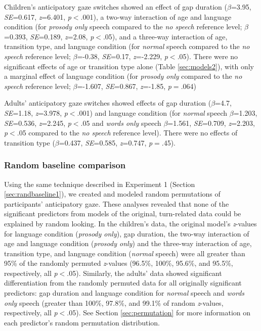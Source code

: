 \documentclass[authoryear, 12pt]{elsarticle}
\begin{document}
Children's anticipatory gaze switches showed an effect of gap duration (\textit{$\beta$}=3.95, \textit{SE}=0.617, \textit{z}=6.401, \textit{p}$<$.001), a two-way interaction of age and language condition (for \textit{prosody only} speech compared to the \textit{no speech} reference level; \textit{$\beta$}=0.393, \textit{SE}=0.189, \textit{z}=2.08, \textit{p}$<$.05), and a three-way interaction of age, transition type, and language condition (for \textit{normal} speech compared to the \textit{no speech} reference level; \textit{$\beta$}=-0.38, \textit{SE}=0.17, \textit{z}=-2.229, \textit{p}$<$.05). There were no significant effects of age or transition type alone (Table \ref{sec:models2}), with only a marginal effect of language condition (for \textit{prosody only} compared to the \textit{no speech} reference level; \textit{$\beta$}=-1.607, \textit{SE}=0.867, \textit{z}=-1.85, \textit{p}$=$.064)

Adults' anticipatory gaze switches showed effects of gap duration (\textit{$\beta$}=4.7, \textit{SE}=1.18, \textit{z}=3.978, \textit{p}$<$.001) and language condition (for \textit{normal} speech \textit{$\beta$}=1.203, \textit{SE}=0.536, \textit{z}=2.245, \textit{p}$<$.05 and \textit{words only} speech \textit{$\beta$}=1.561, \textit{SE}=0.709, \textit{z}=2.203, \textit{p}$<$.05  compared to the \textit{no speech} reference level). There were no effects of transition type (\textit{$\beta$}=0.437, \textit{SE}=0.585, \textit{z}=0.747, \textit{p}$=$.45).

\subsubsection{Random baseline comparison}
\label{sec:randbaseline2}

Using the same technique described in Experiment 1 (Section \ref{sec:randbaseline1}), we created and modeled random permutations of participants' anticipatory gaze. These analyses revealed that none of the significant predictors from models of the original, turn-related data could be explained by random looking. In the children's data, the original model's \textit{z}-values for language condition (\textit{prosody only}), gap duration, the two-way interaction of age and language condition (\textit{prosody only}) and the three-way interaction of age, transition type, and language condition (\textit{normal} speech) were all greater than 95\% of the randomly permuted \textit{z}-values (96.5\%, 100\%, 95.6\%, and 95.5\%, respectively, all \textit{p}$<$.05). Similarly, the adults' data showed significant differentiation from the randomly permuted data for all originally significant predictors: gap duration and language condition for \textit{normal} speech and \textit{words only} speech (greater than 100\%, 97.8\%, and 99.1\% of random \textit{z}-values, respectively, all \textit{p}$<$.05). See Section \ref{sec:permutation} for more information on each predictor's random permutation distribution.
\end{document}
